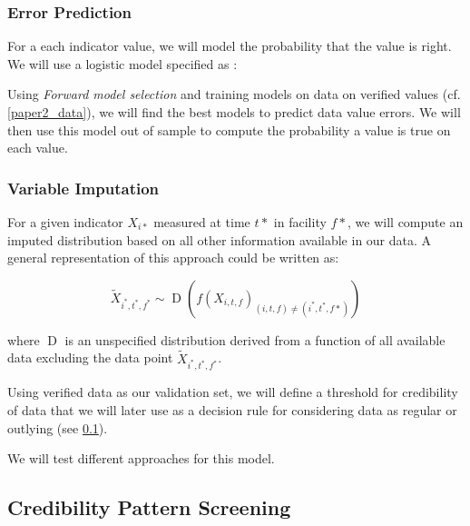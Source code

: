 \subsubsection{Error Prediction}

For a each indicator value, we will model the probability that the value is right. We will use a logistic model specified as :

Using \textit{Forward model selection} and training models on data on verified values (cf. \ref{paper2_data}), we will find the best models to predict data value errors. We will then use this model out of sample to compute the probability a value is true on each value.

\subsubsection{Variable Imputation}

For a given indicator $X_{i*}$ measured at time $t*$ in facility $f*$, we will compute an imputed distribution based on all other information available in our data. A general representation of this approach could be written as:

$$ \widetilde{X}_{i^*,t^*,f^*} \sim \operatorname{D} \left(f\left(X_{i,t,f}\right)_{ \left(i,t,f\right) \neq \left(i^*,t^*,f*\right) } \right) $$

where $\operatorname{D}$ is an unspecified distribution derived from a function of all available data excluding the data point $\widetilde{X}_{i^*,t^*,f^*}$.

Using verified data as our validation set, we will define a threshold for credibility of data that we will later use as a decision rule for considering data as regular or outlying (see \ref{paper2_credib_pattern}).

We will test different approaches for this model.


\subsection{Credibility Pattern Screening}
\label{paper2_credib_pattern}

